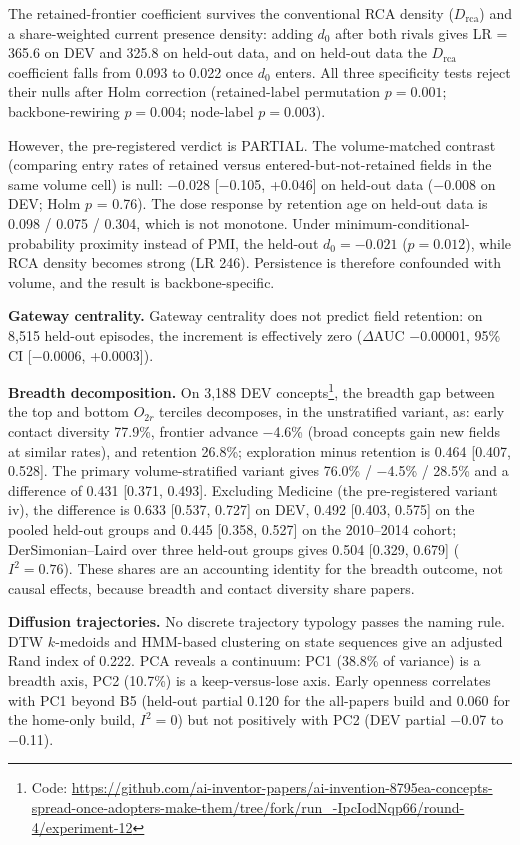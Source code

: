 \documentclass[11pt,letterpaper]{article}
\begin{document}
The retained-frontier coefficient survives the conventional RCA density ($D_{\text{rca}}$) and a share-weighted current presence density: adding $d_0$ after both rivals gives LR = 365.6 on DEV and 325.8 on held-out data, and on held-out data the $D_{\text{rca}}$ coefficient falls from 0.093 to 0.022 once $d_0$ enters. All three specificity tests reject their nulls after Holm correction (retained-label permutation $p = 0.001$; backbone-rewiring $p = 0.004$; node-label $p = 0.003$).

However, the pre-registered verdict is PARTIAL. The volume-matched contrast (comparing entry rates of retained versus entered-but-not-retained fields in the same volume cell) is null: $-$0.028 [$-$0.105, +0.046] on held-out data ($-$0.008 on DEV; Holm $p$ = 0.76). The dose response by retention age on held-out data is 0.098 / 0.075 / 0.304, which is not monotone. Under minimum-conditional-probability proximity \citep{Hidalgo2007} instead of PMI, the held-out $d_0 = -0.021$ ($p = 0.012$), while RCA density becomes strong (LR 246). Persistence is therefore confounded with volume, and the result is backbone-specific.

\textbf{Gateway centrality.} Gateway centrality does not predict field retention: on 8{,}515 held-out episodes, the increment is effectively zero ($\Delta$AUC $-$0.00001, 95\% CI [$-$0.0006, +0.0003]).

\textbf{Breadth decomposition.} On 3{,}188 DEV concepts\footnote{Code: \url{https://github.com/ai-inventor-papers/ai-invention-8795ea-concepts-spread-once-adopters-make-them/tree/fork/run_-IpcIodNqp66/round-4/experiment-12}}, the breadth gap between the top and bottom $O_{2r}$ terciles decomposes, in the unstratified variant, as: early contact diversity 77.9\%, frontier advance $-$4.6\% (broad concepts gain new fields at similar rates), and retention 26.8\%; exploration minus retention is 0.464 [0.407, 0.528]. The primary volume-stratified variant gives 76.0\% / $-$4.5\% / 28.5\% and a difference of 0.431 [0.371, 0.493]. Excluding Medicine (the pre-registered variant iv), the difference is 0.633 [0.537, 0.727] on DEV, 0.492 [0.403, 0.575] on the pooled held-out groups and 0.445 [0.358, 0.527] on the 2010--2014 cohort; DerSimonian--Laird over three held-out groups gives 0.504 [0.329, 0.679] ($I^2 = 0.76$). These shares are an accounting identity for the breadth outcome, not causal effects, because breadth and contact diversity share papers.

\textbf{Diffusion trajectories.} No discrete trajectory typology passes the naming rule. DTW $k$-medoids and HMM-based clustering on state sequences give an adjusted Rand index of 0.222. PCA reveals a continuum: PC1 (38.8\% of variance) is a breadth axis, PC2 (10.7\%) is a keep-versus-lose axis. Early openness correlates with PC1 beyond B5 (held-out partial 0.120 for the all-papers build and 0.060 for the home-only build, $I^2 = 0$) but not positively with PC2 (DEV partial $-$0.07 to $-$0.11).
\end{document}
